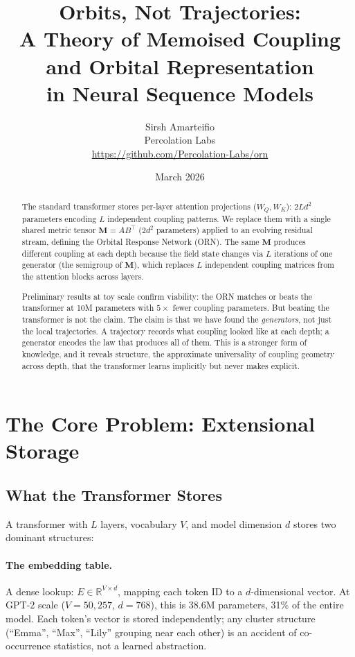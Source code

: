 \documentclass[11pt, a4paper]{article}
\title{%
    \textbf{Orbits, Not Trajectories:}\\[4pt]
    \Large A Theory of Memoised Coupling and Orbital Representation\\
    in Neural Sequence Models%
}
\author{%
    Sirsh Amarteifio\\
    {\small Percolation Labs}\\
    {\small \url{https://github.com/Percolation-Labs/orn}}%
}
\date{March 2026 \quad{\small\textnormal{,  Theory Document, v2}}}
\newcommand{\M}{\mathbf{M}}
\newcommand{\R}{\mathbb{R}}
\theoremstyle{remark}
\begin{document}
\maketitle

\begin{abstract}
The standard transformer stores per-layer attention projections ($W_Q, W_K$): $2Ld^2$ parameters encoding $L$ independent coupling patterns.
We replace them with a single shared metric tensor $\M = AB^\top$ ($2d^2$ parameters) applied to an evolving residual stream, defining the Orbital Response Network (ORN).
The same $\M$ produces different coupling at each depth because the field state changes via $L$ iterations of one generator (the semigroup of $\M$), which replaces $L$ independent coupling matrices from the attention blocks across layers.

Preliminary results at toy scale confirm viability: the ORN matches or beats the transformer at 10M parameters with $5\times$ fewer coupling parameters.
But beating the transformer is not the claim.
The claim is that we have found the \emph{generators}, not just the local trajectories.
A trajectory records what coupling looked like at each depth; a generator encodes the law that produces all of them.
This is a stronger form of knowledge, and it reveals structure, the approximate universality of coupling geometry across depth, that the transformer learns implicitly but never makes explicit.
\end{abstract}

\tableofcontents
\newpage


\section{The Core Problem: Extensional Storage}
\label{sec:core-problem}

\subsection{What the Transformer Stores}

A transformer with $L$ layers, vocabulary $V$, and model dimension $d$ stores two dominant structures:

\paragraph{The embedding table.}
A dense lookup: $E \in \R^{V \times d}$, mapping each token ID to a $d$-dimensional vector.
At GPT-2 scale ($V{=}50{,}257$, $d{=}768$), this is 38.6M parameters, 31\% of the entire model.
Each token's vector is stored independently; any cluster structure (``Emma'', ``Max'', ``Lily'' grouping near each other) is an accident of co-occurrence statistics, not a learned abstraction.
\end{document}
